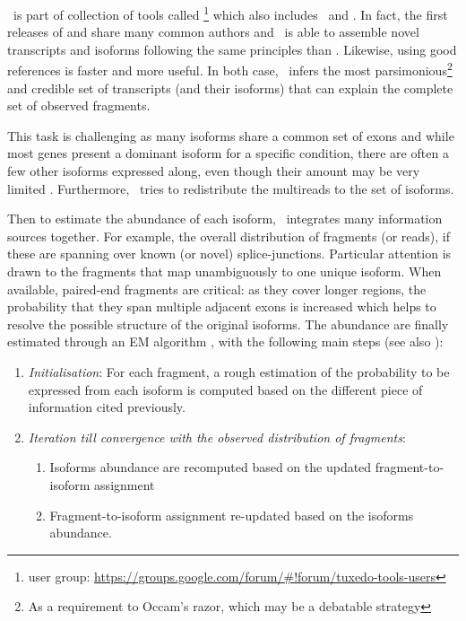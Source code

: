 \cuffl\ is part of collection of tools called
\footnote{ user group:
\href{https://groups.google.com/forum/\#!forum/tuxedo-tools-users}%
{https://groups.google.com/forum/\#!forum/tuxedo-tools-users}} which also includes
\toph\ and . In fact, the first releases of  and
 share many common authors and \cuffl\ is able to assemble
 novel transcripts and isoforms following the same principles
than \toph. Likewise, using good references is faster and more useful.
In both case, \cuffl\ infers the most parsimonious\footnote{As a requirement to
Occam's razor, which may be a debatable strategy }
and credible set of transcripts (and their isoforms) that can explain the
complete set of observed fragments.

This task is challenging as many isoforms share a common set of exons and
while most genes present a dominant isoform for a specific condition,
there are often a few other isoforms expressed along, even though their amount
may be very limited . Furthermore, \cuffl\ tries to
redistribute the multireads to the set of isoforms.

Then to estimate the abundance of each isoform, \cuffl\ integrates many
information sources together. For example, the overall distribution of fragments
(or reads), if these are spanning over known (or novel) splice-junctions.
Particular attention is drawn to the fragments that map unambiguously to one
unique isoform. When available, paired-end fragments are critical:
as they cover longer regions, the probability
that they span multiple adjacent exons is increased which helps to resolve
the possible structure of the original isoforms.  The
abundance are finally estimated through an \gls{EM} algorithm
\citep{EM-what,EM-algo-latest},
with the following main steps (see also ):
\begin{enumerate}
    \item \emph{Initialisation}: For each fragment, a rough estimation of the
        probability to be expressed from each isoform is computed based on the
        different piece of information cited previously.
\item \emph{Iteration till convergence with the observed distribution of fragments}:
    \begin{enumerate}
        \item Isoforms abundance are recomputed based on the updated
            fragment-to-isoform assignment
        \item Fragment-to-isoform assignment re-updated based on the isoforms
            abundance.
    \end{enumerate}
\end{enumerate}


